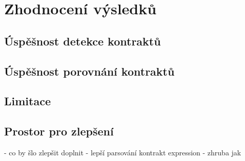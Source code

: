 \chapter{Zhodnocení výsledků}
	\section{Úspěšnost detekce kontraktů}
	
	\section{Úspěšnost porovnání kontraktů}
	
 	\section{Limitace}
 	
 	\section{Prostor pro zlepšení}
 		- co by šlo zlepšit doplnit
  		- lepší parsování kontrakt expression - zhruba jak